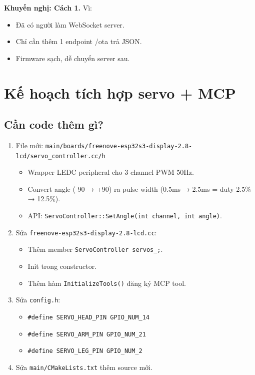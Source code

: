 \documentclass[11pt,a4paper]{article}
\begin{document}
\textbf{Khuyến nghị: Cách 1.} Vì:
\begin{itemize}
  \item Đã có người làm WebSocket server.
  \item Chỉ cần thêm 1 endpoint /ota trả JSON.
  \item Firmware sạch, dễ chuyển server sau.
\end{itemize}

\section{Kế hoạch tích hợp servo + MCP}
\subsection{Cần code thêm gì?}
\begin{enumerate}
  \item File mới: \texttt{main/boards/freenove-esp32s3-display-2.8-lcd/servo\_controller.cc/h}
  \begin{itemize}
    \item Wrapper LEDC peripheral cho 3 channel PWM 50Hz.
    \item Convert angle (-90 → +90) ra pulse width (0.5ms → 2.5ms = duty 2.5\% → 12.5\%).
    \item API: \texttt{ServoController::SetAngle(int channel, int angle)}.
  \end{itemize}
  \item Sửa \texttt{freenove-esp32s3-display-2.8-lcd.cc}:
  \begin{itemize}
    \item Thêm member \texttt{ServoController servos\_;}.
    \item Init trong constructor.
    \item Thêm hàm \texttt{InitializeTools()} đăng ký MCP tool.
  \end{itemize}
  \item Sửa \texttt{config.h}:
  \begin{itemize}
    \item \texttt{\#define SERVO\_HEAD\_PIN GPIO\_NUM\_14}
    \item \texttt{\#define SERVO\_ARM\_PIN GPIO\_NUM\_21}
    \item \texttt{\#define SERVO\_LEG\_PIN GPIO\_NUM\_2}
  \end{itemize}
  \item Sửa \texttt{main/CMakeLists.txt} thêm source mới.
\end{enumerate}
\end{document}
